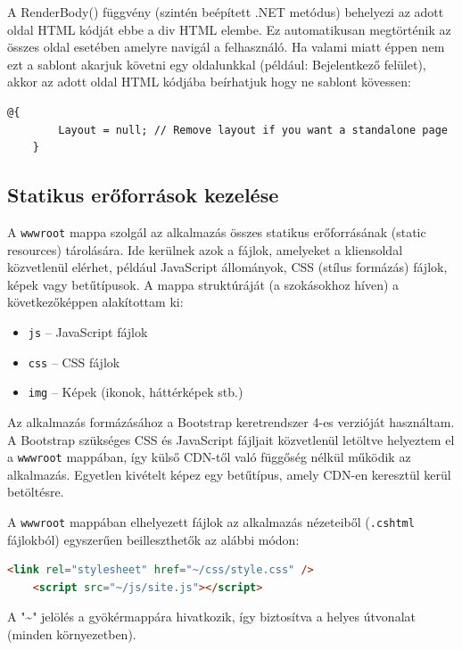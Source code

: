 A RenderBody() függvény (szintén beépített .NET metódus)
behelyezi az adott oldal HTML kódját ebbe a div HTML elembe. Ez
automatikusan megtörténik az összes oldal esetében amelyre
navigál a felhasználó. Ha valami miatt éppen nem ezt a sablont akarjuk követni egy oldalunkkal (például: Bejelentkező felület), akkor az adott oldal HTML kódjába beírhatjuk hogy ne sablont kövessen:

\begin{lstlisting}[language={[Sharp]C}]
	@{
		Layout = null; // Remove layout if you want a standalone page
	}
\end{lstlisting}

\subsection{Statikus erőforrások kezelése}

A \texttt{wwwroot} mappa szolgál az alkalmazás összes statikus erőforrásának (static resources) tárolására. Ide kerülnek azok a fájlok, amelyeket a kliensoldal közvetlenül elérhet, például JavaScript állományok, CSS (stílus formázás) fájlok, képek vagy betűtípusok. A mappa struktúráját (a szokásokhoz híven) a következőképpen alakítottam ki:

\begin{itemize}
	\item \texttt{js} – JavaScript fájlok
	\item \texttt{css} – CSS fájlok
	\item \texttt{img} – Képek (ikonok, háttérképek stb.)
\end{itemize}

Az alkalmazás formázásához a Bootstrap keretrendszer 4-es verzióját használtam. A Bootstrap szükséges CSS és JavaScript fájljait közvetlenül letöltve helyeztem el a \texttt{wwwroot} mappában, így külső CDN-től való függőség nélkül működik az alkalmazás. Egyetlen kivételt képez egy betűtípus, amely CDN-en keresztül kerül betöltésre.

A \texttt{wwwroot} mappában elhelyezett fájlok az alkalmazás nézeteiből (\texttt{.cshtml} fájlokból) egyszerűen beilleszthetők az alábbi módon:

\begin{lstlisting}[language=HTML, caption={Statikus fájlok hivatkozása .cshtml fájlban}]
	<link rel="stylesheet" href="~/css/style.css" />
	<script src="~/js/site.js"></script>
\end{lstlisting}

A "\~{}" jelölés a gyökérmappára hivatkozik, így biztosítva a helyes útvonalat (minden környezetben).

